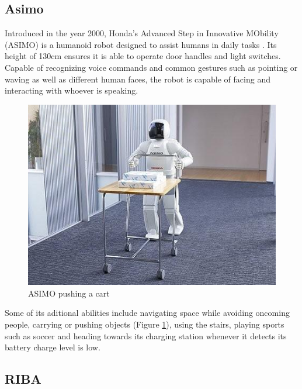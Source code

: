
\subsection{Asimo}

Introduced in the year 2000, Honda's Advanced Step in Innovative MObility (ASIMO) is a humanoid robot designed to assist humans in daily tasks \cite{asimo1}. Its height of 130cm ensures it is able to operate door handles and light switches. Capable of recognizing voice commands and common gestures such as pointing or waving as well as different human faces, the robot is capable of facing and interacting with whoever is speaking\cite{asimo2}. \\


	\begin{figure}[H]
			\centering
			\includegraphics[scale=0.7]{images/StateOfArt/asimo.jpg}
			\caption{ASIMO pushing a cart}
			\label{asimo}
	\end{figure}
	\bigskip

Some of its aditional abilities include navigating space while avoiding oncoming people, carrying or pushing objects (Figure \ref{asimo}), using the stairs, playing sports such as soccer and heading towards its charging station whenever it detects its battery charge level is low.\cite{asimo3}\\

\newpage
\subsection{RIBA}

